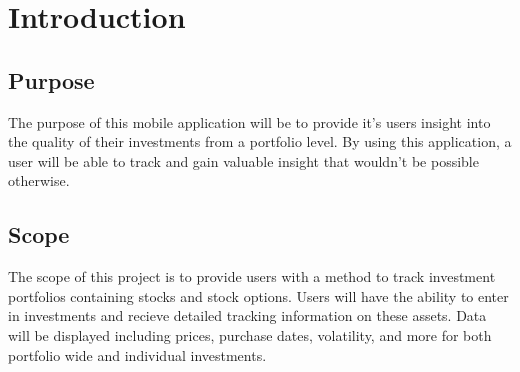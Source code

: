 \documentclass[onecolumn, draftclsnofoot,10pt, compsoc]{IEEEtran}
\begin{document}
\section{Introduction}

\subsection{Purpose}
The purpose of this mobile application will be to provide it's users insight into the quality of their investments from a portfolio level. 
By using this application, a user will be able to track and gain valuable insight that wouldn't be possible otherwise.

\subsection{Scope}
The scope  of this project is to provide users with a method to track investment portfolios containing stocks and stock options. Users will have
the ability  to enter in investments and recieve detailed tracking information on these assets. Data will be displayed including prices, purchase
dates, volatility, and more for both portfolio wide and individual investments.
\end{document}
